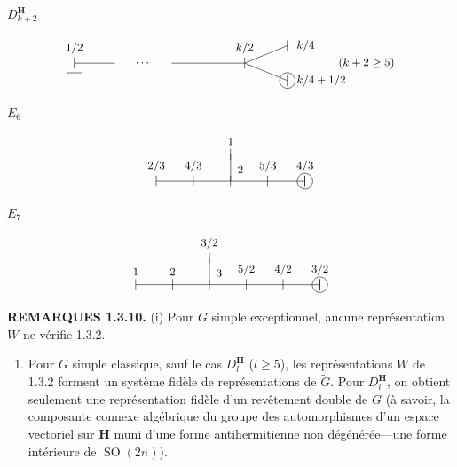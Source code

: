 \documentclass[10pt,a4paper]{article}
\providecommand{\tightlist}{\setlength{\itemsep}{0pt}\setlength{\parskip}{0pt}}
\newcommand{\SourcePage}[2]{\clearpage\setcounter{page}{#2}\typeout{D031_SOURCE_PAGE physical=#1 printed=#2}}
\begin{document}
\(D_{k+2}^{\mathbf H}\)

\[
\begin{tikzpicture}[x=1.15cm,y=0.75cm,baseline=(current bounding box.center),every node/.style={font=\small}]
\node at (0,0) {$\vert$}; \draw (0,0)--(1,0); \node at (1.7,0) {$\cdots$}; \draw (2.4,0)--(4.2,0); \node at (4.2,0) {$\vert$};
\draw (4.2,0)--(5.25,0.65); \draw (4.2,0)--(5.25,-0.65); \node at (5.25,0.65) {$\vert$}; \node[circle,draw,inner sep=1.2pt] at (5.25,-0.65) {$\vert$};
\node[above,yshift=4pt] at (0,0) {$1/2$}; \node[above,yshift=4pt] at (4.2,0) {$k/2$}; \node[right,xshift=4pt] at (5.25,0.65) {$k/4$}; \node[right,xshift=4pt] at (5.25,-0.65) {$k/4+1/2$}; \node at (7.2,0) {$(k+2\ge5)$};
\draw (-0.18,-0.36)--(0.18,-0.36);
\end{tikzpicture}
\]

\(E_6\)

\[
\begin{tikzpicture}[x=1.05cm,y=0.75cm,baseline=(current bounding box.center),every node/.style={font=\small}]
\foreach \x in {0,1,2,3,4}{\node at (\x,0) {$\vert$};} \draw (0,0)--(4,0); \node[circle,draw,inner sep=1.2pt] at (4,0) {$\vert$};
\draw (2,0)--(2,1); \node at (2,1) {$\vert$};
\node[above,yshift=4pt] at (0,0) {$2/3$}; \node[above,yshift=4pt] at (1,0) {$4/3$}; \node[above right,xshift=2pt,yshift=3pt] at (2,0) {$2$}; \node[above,yshift=4pt] at (3,0) {$5/3$}; \node[above,yshift=4pt] at (4,0) {$4/3$}; \node[above,yshift=4pt] at (2,1) {$1$};
\end{tikzpicture}
\]

\(E_7\)

\[
\begin{tikzpicture}[x=1.05cm,y=0.75cm,baseline=(current bounding box.center),every node/.style={font=\small}]
\foreach \x in {0,1,2,3,4,5}{\node at (\x,0) {$\vert$};} \draw (0,0)--(5,0); \node[circle,draw,inner sep=1.2pt] at (5,0) {$\vert$};
\draw (2,0)--(2,1); \node at (2,1) {$\vert$};
\node[above,yshift=4pt] at (0,0) {$1$}; \node[above,yshift=4pt] at (1,0) {$2$}; \node[above right,xshift=2pt,yshift=3pt] at (2,0) {$3$}; \node[above,yshift=4pt] at (3,0) {$5/2$}; \node[above,yshift=4pt] at (4,0) {$4/2$}; \node[above,yshift=4pt] at (5,0) {$3/2$}; \node[above,yshift=4pt] at (2,1) {$3/2$};
\end{tikzpicture}
\]

\SourcePage{16}{262}
\textbf{REMARQUES 1.3.10.} (i) Pour \(G\) simple exceptionnel, aucune représentation \(W\) ne vérifie 1.3.2.

\begin{enumerate}
\def\labelenumi{(\roman{enumi})}
\setcounter{enumi}{1}
\tightlist
\item
  Pour \(G\) simple classique, sauf le cas \(D_l^{\mathbf H}\) (\(l\ge5\)), les représentations \(W\) de 1.3.2 forment un système fidèle de représentations de \(\widetilde G\). Pour \(D_l^{\mathbf H}\), on obtient seulement une représentation fidèle d'un revêtement double de \(G\) (à savoir, la composante connexe algébrique du groupe des automorphismes d'un espace vectoriel sur \(\mathbf H\) muni d'une forme antihermitienne non dégénérée---une forme intérieure de \(\operatorname{SO}(2n)\)).
\end{enumerate}
\end{document}

